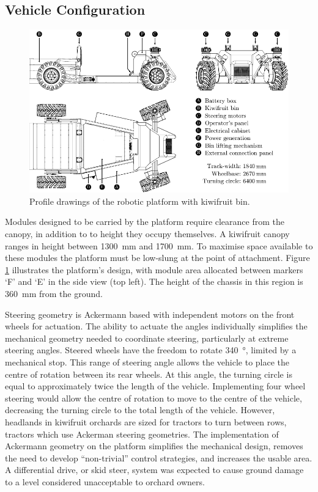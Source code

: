 \documentclass[preprint,authoryear,12pt]{elsarticle}
\begin{document}
    \subsection{Vehicle Configuration}
    \label{sect:mechanical}

        \begin{figure}[htb]
            \centering
            \includegraphics[width=\linewidth]{imgs/profile_views/AMMP-All-Labelled.pdf}
            \caption{Profile drawings of the robotic platform with kiwifruit bin.}
            \label{fig:AMMP}
        \end{figure}

        Modules designed to be carried by the platform require clearance from the canopy, in addition to to height they occupy themselves.
        A kiwifruit canopy ranges in height between \SI{1300}{\milli\meter} and \SI{1700}{\milli\meter}.
        To maximise space available to these modules the platform must be low-slung at the point of attachment.
        Figure \ref{fig:AMMP} illustrates the platform's design, with module area allocated between markers `F' and `E' in the side view (top left).
        The height of the chassis in this region is \SI{360}{\milli\meter} from the ground.

        Steering geometry is Ackermann based with independent motors on the front wheels for actuation.
        The ability to actuate the angles individually simplifies the mechanical geometry needed to coordinate steering, particularly at extreme steering angles.
        Steered wheels have the freedom to rotate \SI{340}{\degree}, limited by a mechanical stop.
        This range of steering angle allows the vehicle to place the centre of rotation between its rear wheels.
        At this angle, the turning circle is equal to approximately twice the length of the vehicle.
        Implementing four wheel steering would allow the centre of rotation to move to the centre of the vehicle, decreasing the turning circle to the total length of the vehicle.
        However, headlands in kiwifruit orchards are sized for tractors to turn between rows, tractors which use Ackerman steering geometries.
        The implementation of Ackermann geometry on the platform simplifies the mechanical design, removes the need to develop ``non-trivial'' control strategies, and increases the usable area.
        A differential drive, or skid steer, system was expected to cause ground damage to a level considered unacceptable to orchard owners.
\end{document}

